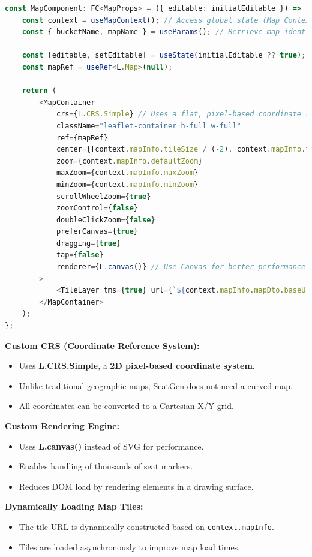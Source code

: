 \begin{lstlisting}[language=TypeScript, caption=Initializing Leaflet Map in React, label=lst:react-leaflet]
const MapComponent: FC<MapProps> = ({ editable: initialEditable }) => {
    const context = useMapContext(); // Access global state (Map Context)
    const { bucketName, mapName } = useParams(); // Retrieve map identifiers from URL params

    const [editable, setEditable] = useState(initialEditable ?? true);
    const mapRef = useRef<L.Map>(null);

    return (
        <MapContainer
            crs={L.CRS.Simple} // Uses a flat, pixel-based coordinate system
            className="leaflet-container h-full w-full"
            ref={mapRef}
            center={[context.mapInfo.tileSize / (-2), context.mapInfo.tileSize / (2)]}
            zoom={context.mapInfo.defaultZoom}
            maxZoom={context.mapInfo.maxZoom}
            minZoom={context.mapInfo.minZoom}
            scrollWheelZoom={true}
            zoomControl={false}
            doubleClickZoom={false}
            preferCanvas={true}
            dragging={true}
            tap={false}
            renderer={L.canvas()} // Use Canvas for better performance
        >
            <TileLayer tms={true} url={`${context.mapInfo.mapDto.baseUrl}/{z}/{x}/{y}.png`} />
        </MapContainer>
    );
};
\end{lstlisting}

\textbf{Custom CRS (Coordinate Reference System):}
\begin{itemize}
    \item Uses \textbf{L.CRS.Simple}, a \textbf{2D pixel-based coordinate system}.
    \item Unlike traditional geographic maps, SeatGen does not need a curved map.
    \item All coordinates can be converted to a Cartesian X/Y grid.
\end{itemize}

\textbf{Custom Rendering Engine:}
\begin{itemize}
    \item Uses \textbf{L.canvas()} instead of SVG for performance.
    \item Enables handling of thousands of seat markers.
    \item Reduces DOM load by rendering elements in a drawing surface.
\end{itemize}

\textbf{Dynamically Loading Map Tiles:}
\begin{itemize}
    \item The tile URL is dynamically constructed based on \texttt{context.mapInfo}.
    \item Tiles are loaded asynchronously to improve map load times.
\end{itemize}



